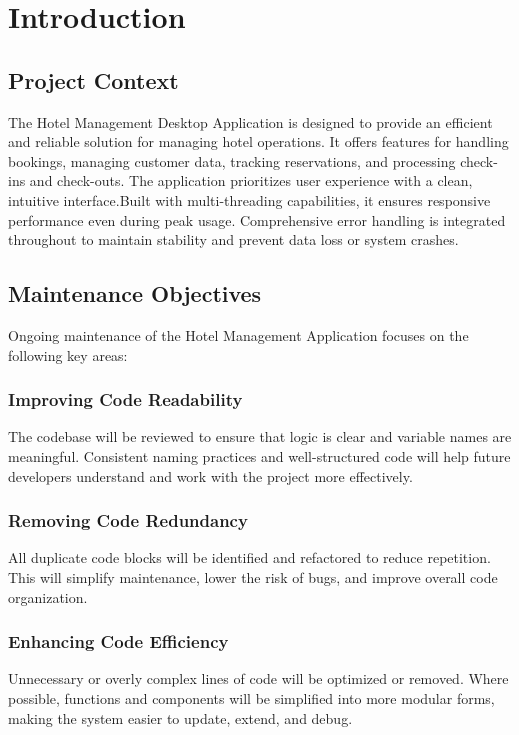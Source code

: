 \documentclass[12pt,a4paper]{article}
\begin{document}
\section{Introduction}
\subsection{Project Context}
The Hotel Management Desktop Application is designed to provide an efficient and reliable solution for managing hotel operations. 
It offers features for handling bookings, managing customer data, tracking reservations, and processing check-ins and check-outs.
The application prioritizes user experience with a clean, intuitive interface.Built with multi-threading capabilities, 
it ensures responsive performance even during peak usage. Comprehensive error handling is integrated throughout to maintain 
stability and prevent data loss or system crashes.

\subsection{Maintenance Objectives}
Ongoing maintenance of the Hotel Management Application focuses on the following key areas:

\subsubsection{Improving Code Readability}
The codebase will be reviewed to ensure that logic is clear and variable names are meaningful. 
Consistent naming practices and well-structured code will help future developers understand and work with the project 
more effectively.

\subsubsection{Removing Code Redundancy}
All duplicate code blocks will be identified and refactored to reduce repetition. This will simplify maintenance, 
lower the risk of bugs, and improve overall code organization.

\subsubsection{Enhancing Code Efficiency}
Unnecessary or overly complex lines of code will be optimized or removed. Where possible, functions and components will be 
simplified into more modular forms, making the system easier to update, extend, and debug.
\end{document}
